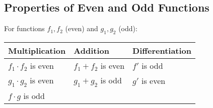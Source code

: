 \subsection{Properties of Even and Odd Functions}
For functions $f_1, f_2$ (even) and $g_1, g_2$ (odd):
\newpar{}
\begin{tabularx}{\linewidth}{@{}XXX@{}}
    Multiplication         & Addition          & Differentiation \\
    \midrule{}
    $f_1\cdot f_2$ is even & $f_1+f_2$ is even & $f'$ is odd     \\
    $g_1\cdot g_2$ is even & $g_1+g_2$ is odd  & $g'$ is even    \\
    $f\cdot g$ is odd      &                   &
\end{tabularx}